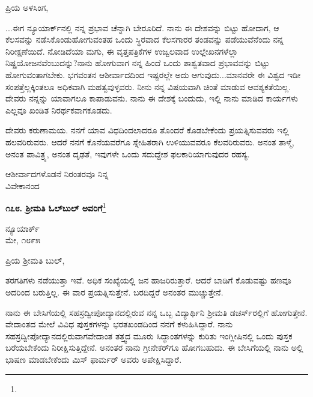\vspace{-0.3cm}

\noindent
ಪ್ರಿಯ ಅಳಸಿಂಗ,

...ಈಗ ನ್ಯೂಯಾರ್ಕ್‌ನಲ್ಲಿ ನನ್ನ ಪ್ರಭಾವ ಚೆನ್ನಾಗಿ ಬೇರೂರಿದೆ. ನಾನು ಈ ದೇಶವನ್ನು ಬಿಟ್ಟು ಹೋದಾಗ, ಆ ಕೆಲಸವನ್ನು ನಡೆಸಿಕೊಂಡುಹೋಗುವಂತಹ ಒಂದು ಸ್ಥಿರವಾದ ಕೆಲಸಗಾರರ ತಂಡವನ್ನು ಪಡೆಯುವೆನೆಂದು ನನ್ನ ನಿರೀಕ್ಷಣೆಯಿದೆ. ನೋಡಿದೆಯಾ ಮಗು, ಈ ವೃತ್ತಪತ್ರಿಕೆಗಳ ಉಜ್ವಲವಾದ ಉಲ್ಲೇಖನಗಳೆಲ್ಲಾ ನಿಷ್ಪ್ರಯೋಜನವೆಂಬುದನ್ನು?ನಾನು ಹೋಗುವಾಗ ನನ್ನ ಹಿಂದೆ ಒಂದು ಶಾಶ್ವತವಾದ ಪ್ರಭಾವವನ್ನು ಬಿಟ್ಟು ಹೋಗುವಂತಾಗಬೇಕು. ಭಗವಂತನ ಆಶೀರ್ವಾದದಿಂದ ಇಷ್ಟರಲ್ಲೇ ಅದು ಆಗುವುದು...ಮಾನವರೇ ಈ ವಿಶ್ವದ ಇಡೀ ಸಂಪತ್ತೆಲ್ಲಕ್ಕಿಂತಲೂ ಅಧಿಕವಾಗಿ ಮಹತ್ವವುಳ್ಳವರು. ನೀನು ನನ್ನ ವಿಷಯವಾಗಿ ಚಿಂತೆ ಮಾಡುವ ಆವಶ್ಯಕತೆಯಿಲ್ಲ. ದೇವರು ನನ್ನನ್ನು ಯಾವಾಗಲೂ ಕಾಪಾಡುವನು. ನಾನು ಈ ದೇಶಕ್ಕೆ ಬಂದುದು, ಇಲ್ಲಿ ನಾನು ಮಾಡಿದ ಕಾರ್ಯಗಳು ಎಲ್ಲವೂ ಖಂಡಿತ ನಿರರ್ಥಕವಾಗಕೂಡದು.

ದೇವರು ಕರುಣಾಮಯ. ನನಗೆ ಯಾವ ವಿಧದಿಂದಲಾದರೂ ತೊಂದರೆ ಕೊಡಬೇಕೆಂದು ಪ್ರಯತ್ನಿಸುವವರು ಇಲ್ಲಿ ಹಲವರಿರುವರು. ಆದರೆ ನನಗೆ ಕೊನೆಯವರೆಗೂ ಸ್ನೇಹಿತರಾಗಿ ಉಳಿಯುವವರೂ ಕೆಲವರಿರುವರು. ಅನಂತ ತಾಳ್ಮೆ, ಅನಂತ ಪಾವಿತ್ರ್ಯ, ಅನಂತ ದೃಢತೆ, ಇವುಗಳೇ ಒಂದು ಸದುದ್ದೇಶ ಫಲಕಾರಿಯಾಗುವುದರ ರಹಸ್ಯ.

\vspace{-0.2cm}

{\flushright
ಆಶೀರ್ವಾದಗಳೊಡನೆ ನಿರಂತರವೂ ನಿನ್ನ\\ವಿವೇಕಾನಂದ\par}

\begin{center}
\textbf{೧೭೮. ಶ‍್ರೀಮತಿ ಓಲ್‌ಬುಲ್‌ ಅವರಿಗೆ}\footnote{}
\end{center}

\vspace{-0.7cm}

\begin{flushright}
ನ್ಯೂಯಾರ್ಕ್\\ಮೇ, ೧೮೯೫
\end{flushright}

\vspace{-0.5cm}

\noindent
ಪ್ರಿಯ ಶ‍್ರೀಮತಿ ಬುಲ್,

ತರಗತಿಗಳು ನಡೆಯುತ್ತಾ ಇವೆ. ಅಧಿಕ ಸಂಖ್ಯೆಯಲ್ಲಿ ಜನ ಹಾಜರಿರುತ್ತಾರೆ. ಆದರೆ ಬಾಡಿಗೆ ಕೊಡುವಷ್ಟು ಹಣವೂ ಅದರಿಂದ ಬರುತ್ತಿಲ್ಲ. ಈ ವಾರ ಪ್ರಯತ್ನಿಸುತ್ತೇನೆ. ಬರದಿದ್ದರೆ ಅನಂತರ ಮುಚ್ಚುತ್ತೇನೆ.

ನಾನು ಈ ಬೇಸಿಗೆಯಲ್ಲಿ ಸಹಸ್ರದ್ವೀಪೋದ್ಯಾನದಲ್ಲಿರುವ ನನ್ನ ಒಬ್ಬ ವಿದ್ಯಾರ್ಥಿನಿ ಶ‍್ರೀಮತಿ ಡಚರ್ಸ್‌ರಲ್ಲಿಗೆ ಹೋಗುತ್ತೇನೆ. ವೇದಾಂತದ ಮೇಲೆ ವಿವಿಧ ಪುಸ್ತಕಗಳನ್ನು ಭರತಖಂಡದಿಂದ ನನಗೆ ಕಳುಹಿಸಿದ್ದಾರೆ. ನಾನು ಸಹಸ್ರದ್ವೀಪೋದ್ಯಾನದಲ್ಲಿರುವಾಗ\break ವೇದಾಂತ ತತ್ತ್ವದ ಮೂರು ಸಿದ್ಧಾಂತಗಳನ್ನು ಕುರಿತು ಇಂಗ್ಲೀಷಿನಲ್ಲಿ ಒಂದು ಪುಸ್ತಕ ಬರೆಯಬೇಕೆಂದು ನಿರೀಕ್ಷಿಸುತ್ತಿದ್ದೇನೆ. ಅನಂತರ ನಾನು ಗ್ರೀನೇಕರ್‌ಗೂ ಹೋಗಬಹುದು. ಈ ಬೇಸಿಗೆಯಲ್ಲಿ ನಾನು ಅಲ್ಲಿ ಭಾಷಣ ಮಾಡಬೇಕೆಂದು ಮಿಸ್ ಫಾರ್ಮರ್ ಅವರು ಅಪೇಕ್ಷಿಸಿದ್ದಾರೆ.

